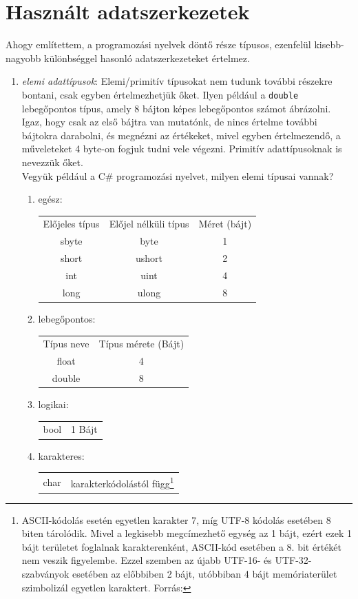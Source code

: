 \documentclass[tocnopagenum]{thesis-ekf}
\theoremstyle{definition}
\theoremstyle{remark}
\begin{document}
	\section{Használt adatszerkezetek}
	Ahogy említettem, a programozási nyelvek döntő része típusos, ezenfelül kisebb-nagyobb különbséggel hasonló adatszerkezeteket értelmez.
	\begin{enumerate}[label=\alph*)]
		\item \emph{elemi adattípusok}: Elemi/primitív típusokat nem tudunk további részekre bontani, csak egyben értelmezhetjük őket. Ilyen például a \verb*|double| lebegőpontos típus, amely 8 bájton képes lebegőpontos számot ábrázolni. Igaz, hogy csak az első bájtra van mutatónk, de nincs értelme további bájtokra darabolni, és megnézni az értékeket, mivel egyben értelmezendő, a műveleteket 4 byte-on fogjuk tudni vele végezni. Primitív adattípusoknak is nevezzük őket.\\
		Vegyük például a C\# programozási nyelvet, milyen elemi típusai vannak?
		\begin{enumerate}
			\item egész:
			\begin{tabular}{ccc}
				Előjeles típus & Előjel nélküli típus & Méret (bájt) \\
				sbyte & byte & 1 \\
				short & ushort & 2 \\
				int & uint & 4 \\
				long & ulong & 8 \\
			\end{tabular}
			\item lebegőpontos:
			\begin{tabular}{cc}
				Típus neve & Típus mérete (Bájt) \\
				float & 4 \\
				double & 8
			\end{tabular}
			\item logikai: 
			\begin{tabular}{cc}
				bool & 1 Bájt
			\end{tabular}
			\item karakteres: 
			\begin{tabular}{cc}
				char & karakterkódolástól függ\footnote{ASCII-kódolás esetén egyetlen karakter 7, míg UTF-8 kódolás esetében 8 biten tárolódik. Mivel a legkisebb megcímezhető egység az 1 bájt, ezért ezek 1 bájt területet foglalnak karakterenként, ASCII-kód esetében a 8. bit értékét nem veszik figyelembe. 
					Ezzel szemben az újabb UTF-16- és UTF-32-szabványok esetében az előbbiben 2 bájt, utóbbiban 4 bájt memóriaterület szimbolizál egyetlen karaktert. Forrás:\cite{gfg_charcoding}}

\end{tabular}
\end{enumerate}
\end{enumerate}
\end{document}
